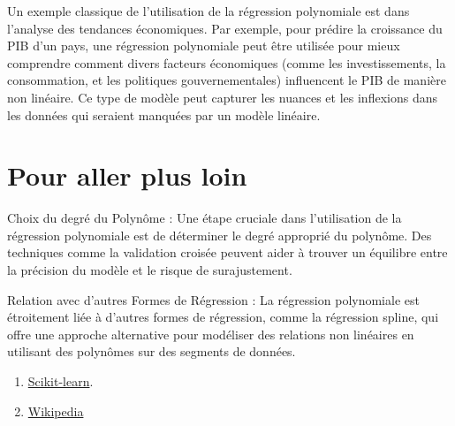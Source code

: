 \documentclass[a0,portrait]{a0poster}
\begin{document}
Un exemple classique de l'utilisation de la régression polynomiale est dans l'analyse des tendances économiques. Par exemple, pour prédire la croissance du PIB d'un pays, une régression polynomiale peut être utilisée pour mieux comprendre comment divers facteurs économiques (comme les investissements, la consommation, et les politiques gouvernementales) influencent le PIB de manière non linéaire. Ce type de modèle peut capturer les nuances et les inflexions dans les données qui seraient manquées par un modèle linéaire.



\color{DarkSlateGray} %


\nocite{*} %


\section*{Pour aller plus loin}

Choix du degré du Polynôme : Une étape cruciale dans l'utilisation de la régression polynomiale est de déterminer le degré approprié du polynôme. Des techniques comme la validation croisée peuvent aider à trouver un équilibre entre la précision du modèle et le risque de surajustement.


Relation avec d'autres Formes de Régression : La régression polynomiale est étroitement liée à d'autres formes de régression, comme la régression spline, qui offre une approche alternative pour modéliser des relations non linéaires en utilisant des polynômes sur des segments de données.


\begin{enumerate}
    \item \href{https://scikit-learn.org/}{Scikit-learn}.
    \item \href{https://en.wikipedia.org/wiki/Polynomial_regression.}{Wikipedia} 
\end{enumerate}


\end{document}
